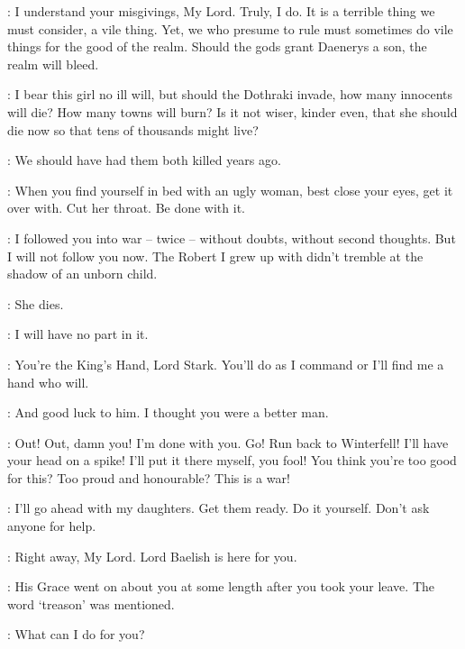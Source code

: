 \VARYS: I understand your misgivings, My Lord. Truly, I do. It is a terrible thing we must consider, a vile thing. Yet, we who presume to rule must sometimes do vile things for the good of the realm. Should the gods grant Daenerys a son, the realm will bleed. 

\PYCELLE: I bear this girl no ill will, but should the Dothraki invade, how many innocents will die? How many towns will burn? Is it not wiser, kinder even, that she should die now so that tens of thousands might live? 

\RENLY: We should have had them both killed years ago. 

\LITTLEFINGER: When you find yourself in bed with an ugly woman, best close your eyes, get it over with. Cut her throat. Be done with it. 

\NED: I followed you into war -- twice -- without doubts, without second thoughts. But I will not follow you now. The Robert I grew up with didn't tremble at the shadow of an unborn child. 

\ROBERT: She dies. 

\NED: I will have no part in it. 

\ROBERT: You're the King's Hand, Lord Stark. You'll do as I command or I'll find me a hand who will. 


\NED: And good luck to him. I thought you were a better man. 

\ROBERT: Out! Out, damn you! I'm done with you.  Go! Run back to Winterfell! I'll have your head on a spike! I'll put it there myself, you fool! You think you're too good for this? Too proud and honourable? This is a war!


\scene



\NED: I'll go ahead with my daughters. Get them ready. Do it yourself. Don't ask anyone for help. 

\JORY: Right away, My Lord. Lord Baelish is here for you. 


\LITTLEFINGER: His Grace went on about you at some length after you took your leave. The word `treason' was mentioned. 

\NED: What can I do for you? 

